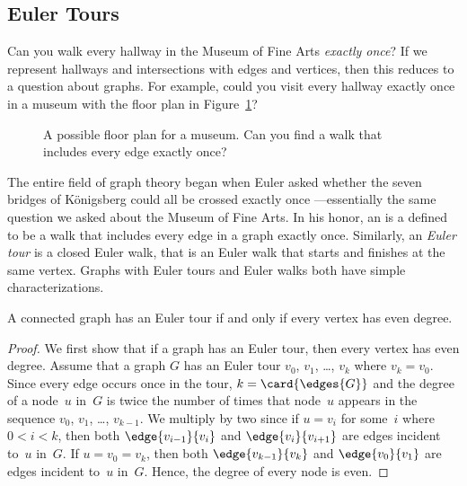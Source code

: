 \begin{editingnotes}
\subsection{Euler Tours}

Can you walk every hallway in the Museum of Fine Arts \emph{exactly
  once}?  If we represent hallways and intersections with edges and
vertices, then this reduces to a question about graphs.  For example,
could you visit every hallway exactly once in a museum with the
floor plan in Figure~\ref{fig:5BC}?

\begin{figure}



\caption{A possible floor plan for a museum. Can you find a walk that
  includes every edge exactly once?}

\label{fig:5BC}

\end{figure}

The entire field of graph theory began when Euler asked whether the seven
bridges of K\"onigsberg could all be crossed exactly once ---essentially
the same question we asked about the Museum of Fine Arts.  In his honor,
an   is a defined to be a walk that
includes every edge in a graph exactly once.  Similarly, an \emph{Euler
  tour} is a closed Euler walk, that is an Euler walk that
  starts and finishes at the same vertex.  Graphs with Euler tours and
  Euler walks both have simple characterizations.
\begin{theorem}\label{thm:euler-tour}
A connected graph has an Euler tour if and only if every vertex has
even degree.
\end{theorem}

\begin{proof}
  We first show that if a graph has an Euler tour, then every vertex has
  even degree.  Assume that a graph $G$ has an Euler tour $v_0$, $v_1$,
  \dots, $v_k$ where $v_k = v_0$.  Since every edge occurs once in
  the tour, $k = \card{\edges{G}}$ and the degree of a node~$u$ in~$G$ is
  twice the number of times that node~$u$ appears in the sequence $v_0$,
  $v_1$, \dots, $v_{k-1}$.  We multiply by two since if $u = v_i$ for
  some~$i$ where $0 < i < k$, then both $\edge{v_{i - 1}}{v_i}$ and
  $\edge{v_i}{v_{i + 1}}$ are edges incident to~$u$ in~$G$.  If $u = v_0 =
  v_k$, then both $\edge{v_{k - 1}}{v_k}$ and $\edge{v_0}{v_1}$ are edges
  incident to~$u$ in~$G$.  Hence, the degree of every node is even.


\end{proof}
\end{editingnotes}
